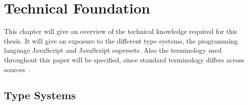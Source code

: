 \chapter{Technical Foundation}
\label{cha:technical-foundation}

This chapter will give an overview of the technical knowledge required for this thesis. It will give an exposure to the different type systems, the programming language JavaScript and JavaScript supersets. Also the terminology used throughout this paper will be specified, since standard terminology differs across sources~\cite[p.~1]{TypeSystems:Cardelli:2004}.

\section{Type Systems}
\label{sec:type-systems}

